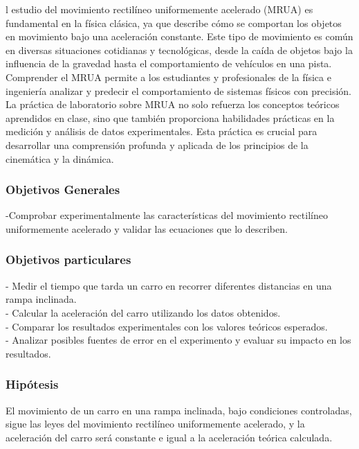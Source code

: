 \documentclass[journal]{IEEEtran}
\begin{document}
l estudio del movimiento rectilíneo uniformemente acelerado (MRUA) es fundamental en la física clásica, ya que describe cómo se comportan los objetos en movimiento bajo una aceleración constante. Este tipo de movimiento es común en diversas situaciones cotidianas y tecnológicas, desde la caída de objetos bajo la influencia de la gravedad hasta el comportamiento de vehículos en una pista. Comprender el MRUA permite a los estudiantes y profesionales de la física e ingeniería analizar y predecir el comportamiento de sistemas físicos con precisión. La práctica de laboratorio sobre MRUA no solo refuerza los conceptos teóricos aprendidos en clase, sino que también proporciona habilidades prácticas en la medición y análisis de datos experimentales. Esta práctica es crucial para desarrollar una comprensión profunda y aplicada de los principios de la cinemática y la dinámica.\\

\subsubsection{Objetivos Generales}

 -Comprobar experimentalmente las características del movimiento rectilíneo uniformemente acelerado y validar las ecuaciones que lo describen.\\

\subsubsection{Objetivos particulares}
- Medir el tiempo que tarda un carro en recorrer diferentes distancias en una rampa inclinada.\\
- Calcular la aceleración del carro utilizando los datos obtenidos.\\
- Comparar los resultados experimentales con los valores teóricos esperados.\\
- Analizar posibles fuentes de error en el experimento y evaluar su impacto en los resultados.\\

\subsubsection{Hipótesis}
El movimiento de un carro en una rampa inclinada, bajo condiciones controladas, sigue las leyes del movimiento rectilíneo uniformemente acelerado, y la aceleración del carro será constante e igual a la aceleración teórica calculada.\\
\end{document}
